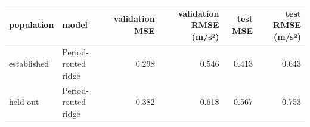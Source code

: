 \begin{tabular}{llrrrr}
\toprule
population & model & validation MSE & validation RMSE (m/s²) & test MSE & test RMSE (m/s²) \\
\midrule
established & Period-routed ridge & 0.298 & 0.546 & 0.413 & 0.643 \\
held-out & Period-routed ridge & 0.382 & 0.618 & 0.567 & 0.753 \\
\bottomrule
\end{tabular}
